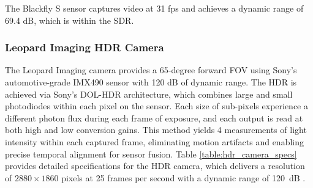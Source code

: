 \documentclass{erauthesis}
\begin{document}
The Blackfly S sensor captures video at 31 \ac{fps} and achieves a dynamic range of 69.4 dB, which is within the \ac{SDR}.

\subsubsection{Leopard Imaging HDR Camera} \label{sensors_HDR}

The Leopard Imaging camera provides a 65-degree forward \ac{FOV} using Sony’s automotive-grade IMX490 sensor with 120 dB of dynamic range.
The \ac{HDR} is achieved via Sony’s \ac{DOL-HDR} architecture, which combines large and small photodiodes within each pixel on the sensor.
Each size of sub-pixels experience a different photon flux during each frame of exposure, and each output is read at both high and low conversion gains.
This method yields 4 measurements of light intensity within each captured frame, eliminating motion artifacts and enabling precise temporal alignment for sensor fusion.
Table \ref{table:hdr_camera_specs} provides detailed specifications for the HDR camera, which delivers a resolution of $2880 \times 1860$ pixels at 25 frames per second with a dynamic range of 120~dB
.%

\end{document}
